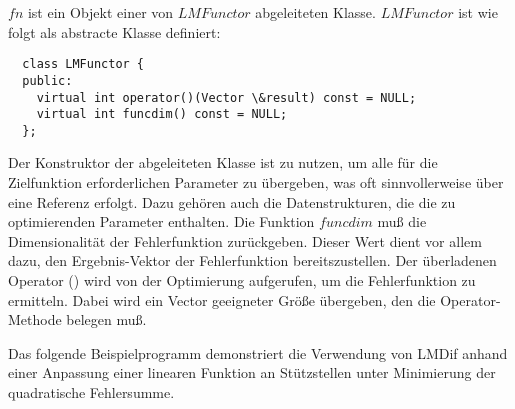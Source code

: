 
$fn$ ist ein Objekt einer von $LMFunctor$ abgeleiteten Klasse. $LMFunctor$
ist wie folgt als abstracte Klasse definiert:
\begin{verbatim}
  class LMFunctor {
  public:
    virtual int operator()(Vector \&result) const = NULL;
    virtual int funcdim() const = NULL;
  };
\end{verbatim}
Der Konstruktor der abgeleiteten Klasse ist zu nutzen, um alle für die
Zielfunktion erforderlichen Parameter zu übergeben, was oft sinnvollerweise
über eine Referenz erfolgt. Dazu gehören auch die
Datenstrukturen, die die zu optimierenden Parameter enthalten. Die Funktion
$funcdim$ muß die Dimensionalität der Fehlerfunktion zurückgeben. Dieser Wert
dient vor allem dazu, den Ergebnis-Vektor der Fehlerfunktion
bereitszustellen. Der überladenen Operator () wird von der Optimierung
aufgerufen, um die Fehlerfunktion zu ermitteln. Dabei wird ein Vector
geeigneter Größe übergeben, den die Operator-Methode belegen muß.

Das folgende Beispielprogramm demonstriert die Verwendung von LMDif anhand
einer Anpassung einer linearen Funktion an Stützstellen unter Minimierung der
quadratische Fehlersumme.

